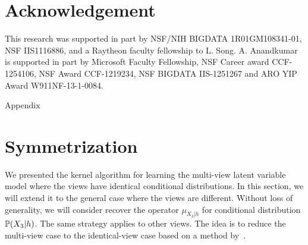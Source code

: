 \documentclass{article}
\begin{document}
\vspace{-3mm}
\section*{\small Acknowledgement}
\vspace{-3mm}
{\small
This research was supported in part by NSF/NIH BIGDATA 1R01GM108341-01, NSF IIS1116886, and a Raytheon faculty fellowship to L. Song. A. Anandkumar is supported in part by  Microsoft Faculty Fellowship, NSF Career award CCF-
1254106, NSF Award CCF-1219234, NSF BIGDATA IIS-1251267 and ARO YIP Award W911NF-13-1-0084.

}

\clearpage
\newpage




\clearpage
\newpage

\onecolumn

\begin{center}
{\Large Appendix}
\end{center}

\vspace{-3mm}
\section{Symmetrization}
\label{sec:symmetrization}
\vspace{-2mm}

We presented the kernel algorithm for learning the multi-view latent variable model where the views have identical conditional distributions. In this section, we will extend it to the general case where the views are different. Without loss of generality, we will consider recover the operator $\mu_{X_3|h}$ for conditional distribution $\mathbb{P}(X_3|h)$. The same strategy applies to other views. The idea is to reduce the multi-view case to the identical-view case based on a method by~\cite{AnandkumarEtal:twosvd12}.
\end{document}
